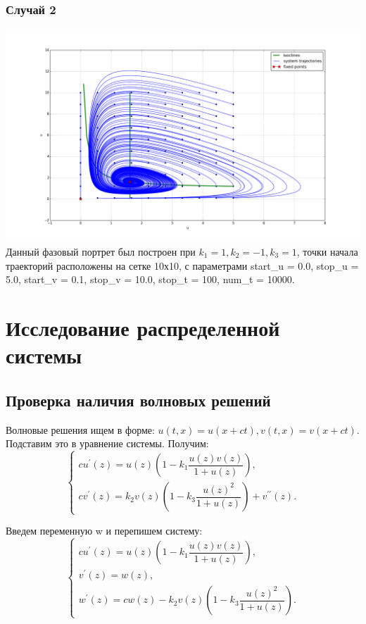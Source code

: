 \documentclass[oneside, final, 12pt]{article}
\begin{document}
\subsubsection{Случай 2}
\includegraphics[width=1\textwidth]{figure_1.png}\\
Данный фазовый портрет был построен при \(k_1 = 1,k_2 = -1,k_3 = 1\), точки начала траекторий расположены на сетке 10х10, с параметрами start_u = 0.0, stop_u = 5.0, start_v = 0.1, stop_v = 10.0, stop_t = 100, num_t = 10000.\\



\newpage
\section{Исследование распределенной системы}
\subsection{Проверка наличия волновых решений}
Волновые решения ищем в форме:  \(u(t,x)=u(x+ct), v(t,x)=v(x+ct) \). Подставим это в уравнение системы. Получим:\\
\[
    \begin{cases}
        c u^\prime(z) = u(z)\left(1 -  k_1\dfrac{u(z)v(z)}{1 + u(z)}\right) , \\
        c v^\prime(z) = k_2 v(z)\left(1 - k_3 \dfrac{u(z)^2}{1 + u(z)}\right) + v^{\prime\prime}(z).
    \end{cases}
\]

Введем переменную w и перепишем систему:\\
\[
    \begin{cases}
        c u^\prime(z) = u(z)\left(1 -  k_1\dfrac{u(z)v(z)}{1 + u(z)}\right) , \\
        v^\prime(z) = w(z) , \\
        w^\prime(z) = cw(z) - k_2 v(z)\left(1 - k_3 \dfrac{u(z)^2}{1 + u(z)}\right).
    \end{cases}
\]
\end{document}
